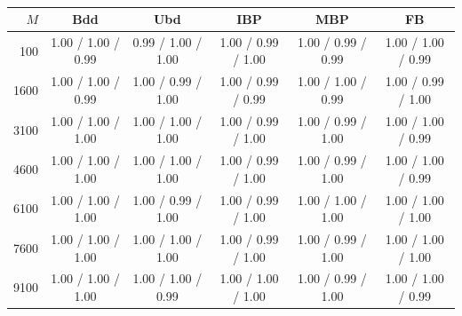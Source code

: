 \begin{table}[ht!]
    \centering
    \small
    \begin{tabular}{r c c c c c}
    \hline
    $M$ & Bdd & Ubd & IBP & MBP & FB \\
    \hline
    100 & 1.00 / 1.00 / 0.99 & 0.99 / 1.00 / 1.00 & 1.00 / 0.99 / 1.00 & 1.00 / 0.99 / 0.99 & 1.00 / 1.00 / 0.99 \\
    1600 & 1.00 / 1.00 / 0.99 & 1.00 / 0.99 / 1.00 & 1.00 / 0.99 / 0.99 & 1.00 / 1.00 / 0.99 & 1.00 / 0.99 / 1.00 \\
    3100 & 1.00 / 1.00 / 1.00 & 1.00 / 1.00 / 1.00 & 1.00 / 0.99 / 1.00 & 1.00 / 0.99 / 1.00 & 1.00 / 1.00 / 0.99 \\
    4600 & 1.00 / 1.00 / 1.00 & 1.00 / 1.00 / 1.00 & 1.00 / 0.99 / 1.00 & 1.00 / 0.99 / 1.00 & 1.00 / 1.00 / 0.99 \\
    6100 & 1.00 / 1.00 / 1.00 & 1.00 / 0.99 / 1.00 & 1.00 / 0.99 / 1.00 & 1.00 / 1.00 / 1.00 & 1.00 / 1.00 / 1.00 \\
    7600 & 1.00 / 1.00 / 1.00 & 1.00 / 1.00 / 1.00 & 1.00 / 0.99 / 1.00 & 1.00 / 0.99 / 1.00 & 1.00 / 1.00 / 1.00 \\
    9100 & 1.00 / 1.00 / 1.00 & 1.00 / 1.00 / 0.99 & 1.00 / 1.00 / 1.00 & 1.00 / 0.99 / 1.00 & 1.00 / 1.00 / 0.99 \\
    \hline
    \end{tabular}
    \caption{}
    \label{tab:Exp1_features_zipfs}
\end{table}
